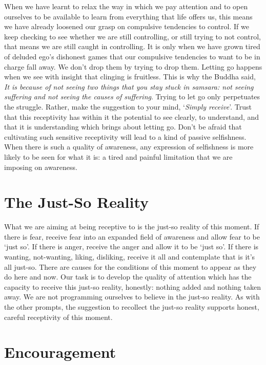 When we have learnt to relax the way in which we pay attention and to
open ourselves to be available to learn from everything that life offers
us, this means we have already loosened our grasp on compulsive
tendencies to control. If we keep checking to see whether we are still
controlling, or still trying to not control, that means we are still
caught in controlling. It is only when we have grown tired of deluded
ego's dishonest games that our compulsive tendencies to want to be in
charge fall away. We don't drop them by trying to drop them. Letting go
happens when we see with insight that clinging is fruitless. This is why
the Buddha said, \emph{It is because of not seeing two things that you
stay stuck in samsara: not seeing suffering and not seeing the causes of
suffering}. Trying to let go only perpetuates the struggle. Rather, make
the suggestion to your mind, `\emph{Simply receive}'. Trust that this
receptivity has within it the potential to see clearly, to understand,
and that it is understanding which brings about letting go. Don't be
afraid that cultivating such sensitive receptivity will lead to a kind
of passive selfishness. When there is such a quality of awareness, any
expression of selfishness is more likely to be seen for what it is: a
tired and painful limitation that we are imposing on awareness.

\section{The Just-So Reality}

What we are aiming at being receptive to is the just-so reality of this moment.
If there is fear, receive fear into an expanded field of awareness and
allow fear to be `just so'. If there is anger, receive the anger and
allow it to be `just so'. If there is wanting, not-wanting, liking,
disliking, receive it all and contemplate that is it's all just-so. There are
causes for the conditions of this moment to appear as they do here and
now. Our task is to develop the quality of attention which has the capacity to
receive this just-so reality, honestly: nothing added and nothing taken
away. We are not programming ourselves to believe in the just-so
reality. As with the other prompts, the suggestion to recollect the
just-so reality supports honest, careful receptivity of this moment.

\sectionBreak

\section{Encouragement}

